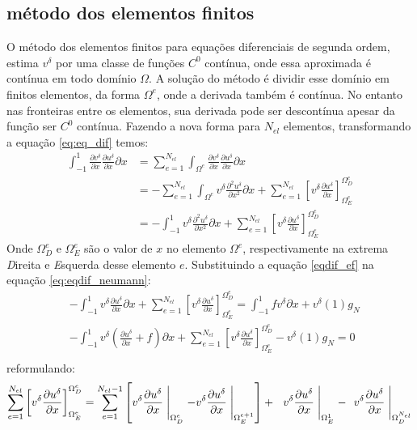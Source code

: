 \subsection{método dos elementos finitos}
 O método dos elementos finitos para equações diferenciais de segunda ordem, estima $v^\delta$ por uma classe de funções $C^0$ contínua, onde essa aproximada é contínua em todo domínio $\Omega$. A solução do método é dividir esse domínio em finitos elementos, da forma $\Omega^e$, onde a derivada também é contínua. No entanto nas fronteiras entre os elementos, sua derivada pode ser descontínua apesar da função ser $C^0$ contínua.
 Fazendo a nova forma para $N_{el}$ elementos, transformando a equação \eqref{eq:eq_dif} temos:
\begin{align} 
 \int^1_{-1} \frac{\partial v^\delta}{\partial x}\frac{\partial u^\delta}{\partial x} \partial x&= 
\sum^{N_{el}}_{e=1} \int_{\Omega^e}\frac{\partial v^\delta}{\partial x}\frac{\partial u^\delta}{\partial x} \partial x\\
& = - \sum^{N_{el}}_{e=1} \int_{\Omega^e} v^\delta\frac{\partial^2 u^\delta}{\partial x^2} \partial x +\sum^{N_{el}}_{e=1} \left [ v^\delta \frac{\partial u^\delta}{\partial x}\right ]^{\Omega^e_D}_{\Omega^e_E}\\
& = -\int^1_{-1} v^\delta\frac{\partial^2 u^\delta}{\partial x^2}  \partial x +\sum^{N_{el}}_{e=1} \left [ v^\delta \frac{\partial u^\delta}{\partial x}\right ]^{\Omega^e_D}_{\Omega^e_E}\label{eqdif_ef}
\end{align}
 Onde $\Omega^e_D$ e $\Omega^e_E$ são o valor de $x$ no elemento  $\Omega^e$, respectivamente na extrema \emph{D}ireita e \emph{E}squerda desse elemento $e$. Substituindo a equação \eqref{eqdif_ef} na equação \eqref{eq:eqdif_neumann}:
 \begin{align}
& -\int^1_{-1} v^\delta\frac{\partial u^\delta}{\partial x} \partial x +\sum^{N_{el}}_{e=1} \left [ v^\delta \frac{\partial u^\delta}{\partial x}\right ]^{\Omega^e_D}_{\Omega^e_E} =\int^1_{-1} fv^\delta  \partial x + v^\delta(1)g_N \\
& -\int^1_{-1} v^\delta\left (\frac{\partial u^\delta}{\partial x} + f  \right ) \partial x +\sum^{N_{el}}_{e=1} \left [ v^\delta \frac{\partial u^\delta}{\partial x}\right ]^{\Omega^e_D}_{\Omega^e_E} -  v^\delta(1)g_N = 0 \\
 \end{align}
  reformulando:
\begin{equation}
\sum^{N_{el}}_{e=1} \left [ v^\delta \frac{\partial u^\delta}{\partial x}\right ]^{\Omega^e_D}_{\Omega^e_E} = \sum^{{N_{el} -1}}_{e=1} \left [ v^\delta \frac{\partial u^\delta}{\partial x}\Biggm\lvert_{\Omega^e_D} -  v^\delta \frac{\partial u^\delta}{\partial x}\Biggm\lvert_{\Omega^{e+ 1}_E}    \right ] +\ \    v^\delta \frac{\partial u^\delta}{\partial x}\Biggm\lvert_{\Omega^{1}_E} -\ \   v^\delta \frac{\partial u^\delta}{\partial x}\Biggm\lvert_{\Omega^{N_{el}}_D}
\end{equation}
